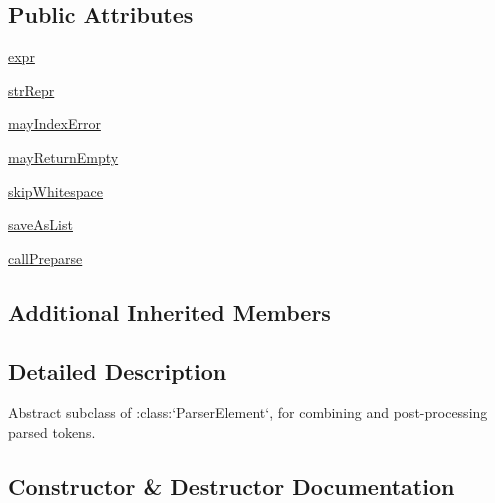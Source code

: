 \subsection*{Public Attributes}
\begin{DoxyCompactItemize}
\item 
\hyperlink{classpip_1_1__vendor_1_1pyparsing_1_1ParseElementEnhance_af574b49a0a7d914693fdaa833df7098f}{expr}
\item 
\hyperlink{classpip_1_1__vendor_1_1pyparsing_1_1ParseElementEnhance_ac8ea1d6abc2f99d13ad7c9a19e7f4314}{str\+Repr}
\item 
\hyperlink{classpip_1_1__vendor_1_1pyparsing_1_1ParseElementEnhance_ae9889f306a4dfbf43d0ebd9375fd5ab6}{may\+Index\+Error}
\item 
\hyperlink{classpip_1_1__vendor_1_1pyparsing_1_1ParseElementEnhance_a705ece03fc1399588994e95b9b780258}{may\+Return\+Empty}
\item 
\hyperlink{classpip_1_1__vendor_1_1pyparsing_1_1ParseElementEnhance_a1a5b2661f5a93e910c481a49981973ee}{skip\+Whitespace}
\item 
\hyperlink{classpip_1_1__vendor_1_1pyparsing_1_1ParseElementEnhance_ad45bc4db8f7b8fb012cee4cac880692f}{save\+As\+List}
\item 
\hyperlink{classpip_1_1__vendor_1_1pyparsing_1_1ParseElementEnhance_a2f1da098955be46b9621c8b6d41d22a5}{call\+Preparse}
\end{DoxyCompactItemize}
\subsection*{Additional Inherited Members}


\subsection{Detailed Description}
\begin{DoxyVerb}Abstract subclass of :class:`ParserElement`, for combining and
post-processing parsed tokens.
\end{DoxyVerb}
 

\subsection{Constructor \& Destructor Documentation}
\mbox{\label{classpip_1_1__vendor_1_1pyparsing_1_1ParseElementEnhance_a8737d46a70ea9c0b500281e8ba6c00c7}} 
